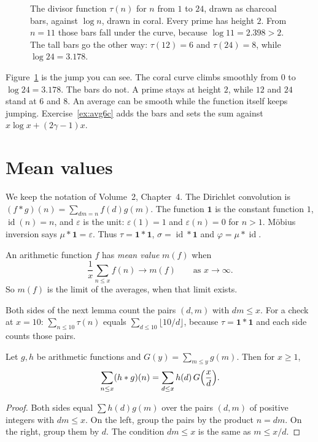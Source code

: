 \begin{figure}[ht]
\centering
{}
\caption{The divisor function $\tau(n)$ for $n$ from $1$ to $24$, drawn as charcoal bars, against $\log n$, drawn in coral. Every prime has height $2$. From $n=11$ those bars fall under the curve, because $\log11=2.398>2$. The tall bars go the other way: $\tau(12)=6$ and $\tau(24)=8$, while $\log24=3.178$.}
\label{fig:taubars}
\end{figure}

Figure~\ref{fig:taubars} is the jump you can see. The coral curve climbs smoothly from $0$ to $\log24=3.178$. The bars do not. A prime stays at height $2$, while $12$ and $24$ stand at $6$ and $8$. An average can be smooth while the function itself keeps jumping. Exercise~\ref{ex:avg6c} adds the bars and sets the sum against $x\log x+(2\gamma-1)x$.

\section{Mean values}

We keep the notation of Volume~2, Chapter~4. The Dirichlet convolution is $(f*g)(n)=\sum_{dm=n}f(d)g(m)$. The function $\mathbf1$ is the constant function $1$, $\operatorname{id}(n)=n$, and $\varepsilon$ is the unit: $\varepsilon(1)=1$ and $\varepsilon(n)=0$ for $n>1$. Möbius inversion says $\mu*\mathbf1=\varepsilon$. Thus $\tau=\mathbf1*\mathbf1$, $\sigma=\operatorname{id}*\mathbf1$ and $\varphi=\mu*\operatorname{id}$.

An arithmetic function $f$ has \emph{mean value} $m(f)$ when
\[
\frac1x\sum_{n\le x}f(n)\to m(f)\qquad\text{as }x\to\infty.
\]
So $m(f)$ is the limit of the averages, when that limit exists.

Both sides of the next lemma count the pairs $(d,m)$ with $dm\le x$. For a check at $x=10$: $\sum_{n\le10}\tau(n)$ equals $\sum_{d\le10}\lfloor10/d\rfloor$, because $\tau=\mathbf1*\mathbf1$ and each side counts those pairs.

\begin{lemma}\label{lem:convsum}
Let $g,h$ be arithmetic functions and $G(y)=\sum_{m\le y}g(m)$. Then for $x\ge1$,
\[
\sum_{n\le x}(h*g)(n)=\sum_{d\le x}h(d)\,G\Bigl(\frac xd\Bigr).
\]
\end{lemma}
\begin{proof}
Both sides equal $\sum h(d)g(m)$ over the pairs $(d,m)$ of positive integers with $dm\le x$. On the left, group the pairs by the product $n=dm$. On the right, group them by $d$. The condition $dm\le x$ is the same as $m\le x/d$.
\end{proof}

